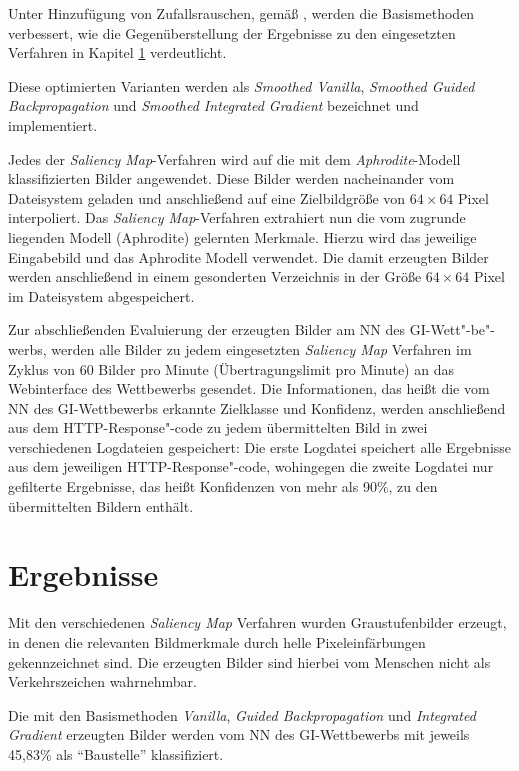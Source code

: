 Unter Hinzufügung von Zufallsrauschen, gemäß \cite{smilkov_smoothgrad:_2017}, werden die Basismethoden verbessert, wie die Gegenüberstellung der Ergebnisse zu den eingesetzten Verfahren in Kapitel \ref{sec:SalErgebnisse} verdeutlicht.

Diese optimierten Varianten werden als \textit{Smoothed Vanilla}, \textit{Smoothed Guided Backpropagation} und \textit{Smoothed Integrated Gradient} bezeichnet und implementiert.

Jedes der \textit{Saliency Map}-Verfahren wird auf die mit dem \textit{Aphrodite}-Modell klassifizierten Bilder angewendet.
Diese Bilder werden nacheinander vom Dateisystem geladen und anschließend auf eine Zielbildgröße von $64 \times 64 $ Pixel interpoliert. 
Das \textit{Saliency Map}-Verfahren extrahiert nun die vom zugrunde liegenden Modell (Aphrodite) gelernten Merkmale. 
Hierzu wird das jeweilige Eingabebild und das Aphrodite Modell verwendet. 
Die damit erzeugten Bilder werden anschließend in einem gesonderten Verzeichnis in der Größe $64 \times 64 $ Pixel im Dateisystem abgespeichert.


Zur abschließenden Evaluierung der erzeugten Bilder am \ac{NN} des \ac{GI}-Wett"-be"-werbs, werden alle Bilder zu jedem eingesetzten \textit{Saliency Map} Verfahren im Zyklus von 60 Bilder pro Minute (Übertragungslimit pro Minute) an das Webinterface des Wettbewerbs gesendet. 
Die Informationen, das heißt die vom \ac{NN} des \ac{GI}-Wettbewerbs erkannte Zielklasse und Konfidenz, werden anschließend aus dem HTTP-Response"-code zu jedem übermittelten Bild in zwei verschiedenen Logdateien gespeichert: 
Die erste Logdatei speichert alle Ergebnisse aus dem jeweiligen HTTP-Response"-code, wohingegen die zweite Logdatei nur gefilterte Ergebnisse, das heißt Konfidenzen von mehr als 90\%, zu den übermittelten Bildern enthält.

\section{Ergebnisse}
\label{sec:SalErgebnisse}
Mit den verschiedenen \textit{Saliency Map} Verfahren wurden Graustufenbilder erzeugt, in denen die relevanten Bildmerkmale durch helle Pixeleinfärbungen gekennzeichnet sind. 
Die erzeugten Bilder sind hierbei vom Menschen nicht als Verkehrszeichen wahrnehmbar.

Die mit den Basismethoden \textit{Vanilla}, \textit{Guided Backpropagation} und \textit{Integrated Gradient} erzeugten Bilder werden vom \ac{NN} des \ac{GI}-Wettbewerbs mit jeweils 45,83\% als "`Baustelle"' klassifiziert.

